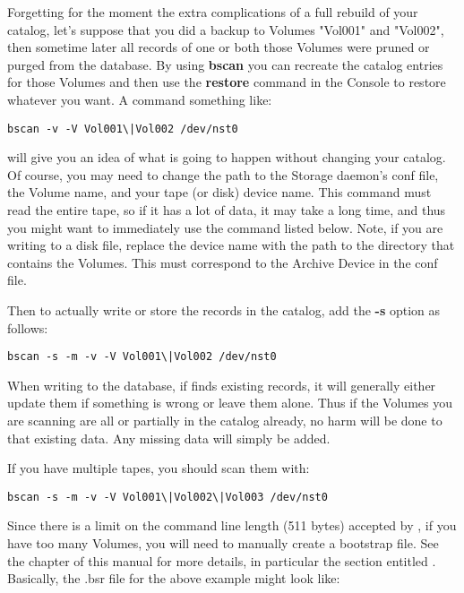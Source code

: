 Forgetting for the moment the extra complications of a full rebuild of
your catalog, let's suppose that you did a backup to Volumes "Vol001"
and "Vol002", then sometime later all records of one or both those
Volumes were pruned or purged from the
database. By using {\bf bscan} you can recreate the catalog entries for
those Volumes and then use the {\bf restore} command in the Console to restore
whatever you want. A command something like:

\footnotesize
\begin{verbatim}
bscan -v -V Vol001\|Vol002 /dev/nst0
\end{verbatim}
\normalsize

will give you an idea of what is going to happen without changing
your catalog. Of course, you may need to change the path to the Storage
daemon's conf file, the Volume name, and your tape (or disk) device name. This
command must read the entire tape, so if it has a lot of data, it may take a
long time, and thus you might want to immediately use the command listed
below. Note, if you are writing to a disk file, replace the device name with
the path to the directory that contains the Volumes. This must correspond to
the Archive Device in the conf file.

Then to actually write or store the records in the catalog, add the {\bf -s}
option as follows:

\footnotesize
\begin{verbatim}
bscan -s -m -v -V Vol001\|Vol002 /dev/nst0
\end{verbatim}
\normalsize

When writing to the database, if  finds existing records, it will
generally either update them if something is wrong or leave them alone. Thus
if the Volumes you are scanning are all or partially in the catalog already, no
harm will be done to that existing data. Any missing data will simply be
added.

If you have multiple tapes, you should scan them with:

\footnotesize
\begin{verbatim}
bscan -s -m -v -V Vol001\|Vol002\|Vol003 /dev/nst0
\end{verbatim}
\normalsize

Since there is a limit on the command line length (511 bytes) accepted
by , if you have too many Volumes, you will need to manually
create a bootstrap file.  See the 
chapter of this manual for more details, in particular the section
entitled . Basically, the
.bsr file for the above example might look like:

